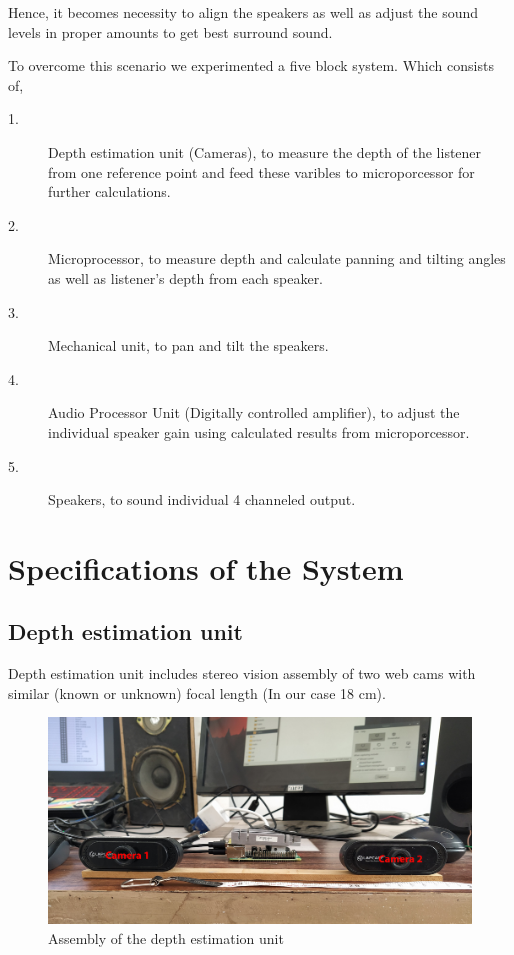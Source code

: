 \documentclass[twocolumn]{report}
\begin{document}
\FloatBarrier

Hence, it becomes necessity to align the speakers as well as adjust the sound levels
in proper amounts to get best surround sound.

To overcome this scenario we experimented a five
block system. Which consists of,

\begin{description}
    \item[1.]Depth estimation unit (Cameras), to measure the depth of the listener
            from one reference point and feed these varibles to microporcessor for 
            further calculations.
    \item[2.]Microprocessor, to measure depth and calculate 
            panning and tilting angles as well as listener's depth
            from each speaker.
    \item[3.]Mechanical unit, to pan and tilt the speakers.
    \item[4.]Audio Processor Unit (Digitally controlled amplifier),
            to adjust the individual speaker gain using calculated 
            results from microporcessor.
    \item[5.]Speakers, to sound individual 4 channeled output.
\end{description} 

\section{Specifications of the System}

\subsection{Depth estimation unit}

Depth estimation unit includes stereo vision assembly of two web cams with similar 
(known or unknown) focal length (In our case 18 cm).

\begin{figure}[h]
    \includegraphics[width=\columnwidth]{assembly.png}
    \caption{Assembly of the depth estimation unit}
\end{figure}
\end{document}
